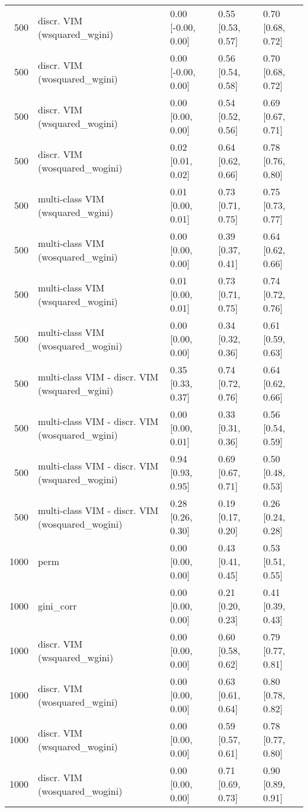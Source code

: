 \begin{table}[ht]
\begin{tabular}{rllll}
  500 & discr. VIM (wsquared\_wgini) & 0.00 [-0.00, 0.00] & 0.55 [0.53, 0.57] & 0.70 [0.68, 0.72] \\ 
  500 & discr. VIM (wosquared\_wgini) & 0.00 [-0.00, 0.00] & 0.56 [0.54, 0.58] & 0.70 [0.68, 0.72] \\ 
  500 & discr. VIM (wsquared\_wogini) & 0.00 [0.00, 0.00] & 0.54 [0.52, 0.56] & 0.69 [0.67, 0.71] \\ 
  500 & discr. VIM (wosquared\_wogini) & 0.02 [0.01, 0.02] & 0.64 [0.62, 0.66] & 0.78 [0.76, 0.80] \\ 
  500 & multi-class VIM (wsquared\_wgini) & 0.01 [0.00, 0.01] & 0.73 [0.71, 0.75] & 0.75 [0.73, 0.77] \\ 
  500 & multi-class VIM (wosquared\_wgini) & 0.00 [0.00, 0.00] & 0.39 [0.37, 0.41] & 0.64 [0.62, 0.66] \\ 
  500 & multi-class VIM (wsquared\_wogini) & 0.01 [0.00, 0.01] & 0.73 [0.71, 0.75] & 0.74 [0.72, 0.76] \\ 
  500 & multi-class VIM (wosquared\_wogini) & 0.00 [0.00, 0.00] & 0.34 [0.32, 0.36] & 0.61 [0.59, 0.63] \\ 
  500 & multi-class VIM - discr. VIM (wsquared\_wgini) & 0.35 [0.33, 0.37] & 0.74 [0.72, 0.76] & 0.64 [0.62, 0.66] \\ 
  500 & multi-class VIM - discr. VIM (wosquared\_wgini) & 0.00 [0.00, 0.01] & 0.33 [0.31, 0.36] & 0.56 [0.54, 0.59] \\ 
  500 & multi-class VIM - discr. VIM (wsquared\_wogini) & 0.94 [0.93, 0.95] & 0.69 [0.67, 0.71] & 0.50 [0.48, 0.53] \\ 
  500 & multi-class VIM - discr. VIM (wosquared\_wogini) & 0.28 [0.26, 0.30] & 0.19 [0.17, 0.20] & 0.26 [0.24, 0.28] \\ 
   \hline 1000 & perm & 0.00 [0.00, 0.00] & 0.43 [0.41, 0.45] & 0.53 [0.51, 0.55] \\ 
  1000 & gini\_corr & 0.00 [0.00, 0.00] & 0.21 [0.20, 0.23] & 0.41 [0.39, 0.43] \\ 
  1000 & discr. VIM (wsquared\_wgini) & 0.00 [0.00, 0.00] & 0.60 [0.58, 0.62] & 0.79 [0.77, 0.81] \\ 
  1000 & discr. VIM (wosquared\_wgini) & 0.00 [0.00, 0.00] & 0.63 [0.61, 0.64] & 0.80 [0.78, 0.82] \\ 
  1000 & discr. VIM (wsquared\_wogini) & 0.00 [0.00, 0.00] & 0.59 [0.57, 0.61] & 0.78 [0.77, 0.80] \\ 
  1000 & discr. VIM (wosquared\_wogini) & 0.00 [0.00, 0.00] & 0.71 [0.69, 0.73] & 0.90 [0.89, 0.91] \\ 

\end{tabular}
\end{table}
